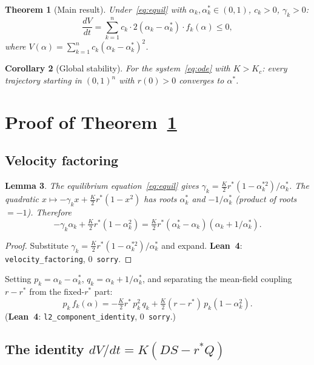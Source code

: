 \documentclass[11pt,a4paper]{article}
\newtheorem{theorem}{Theorem}[section]
\newtheorem{lemma}[theorem]{Lemma}
\newtheorem{corollary}[theorem]{Corollary}
\theoremstyle{definition}
\begin{document}
\begin{theorem}[Main result]\label{thm:main}
Under~\eqref{eq:equil} with $\alpha_k, \alpha_k^* \in (0,1)$, $c_k > 0$, $\gamma_k > 0$:
\[
\frac{dV}{dt} = \sum_{k=1}^n c_k \cdot 2(\alpha_k - \alpha_k^*) \cdot f_k(\alpha) \leq 0,
\]
where $V(\alpha) = \sum_{k=1}^n c_k (\alpha_k - \alpha_k^*)^2$.
\end{theorem}

\begin{corollary}[Global stability]\label{cor:global}
For the system~\eqref{eq:ode} with $K > K_c$: every trajectory starting in $(0,1)^n$ with $r(0) > 0$ converges to $\alpha^*$.
\end{corollary}

\section{Proof of Theorem~\ref{thm:main}}

\subsection{Velocity factoring}

\begin{lemma}\label{lem:factor}
The equilibrium equation~\eqref{eq:equil} gives $\gamma_k = \frac{K}{2}r^*(1-\alpha_k^{*2})/\alpha_k^*$. The quadratic $x \mapsto -\gamma_k x + \frac{K}{2}r^*(1-x^2)$ has roots $\alpha_k^*$ and $-1/\alpha_k^*$ (product of roots $= -1$). Therefore
\[
-\gamma_k\alpha_k + \tfrac{K}{2}r^*(1-\alpha_k^2) = \tfrac{K}{2}r^*(\alpha_k^* - \alpha_k)(\alpha_k + 1/\alpha_k^*).
\]
\end{lemma}

\begin{proof}
Substitute $\gamma_k = \frac{K}{2}r^*(1-\alpha_k^{*2})/\alpha_k^*$ and expand. \textbf{Lean~4}: \texttt{velocity\_factoring}, 0~\texttt{sorry}.
\end{proof}

Setting $p_k = \alpha_k - \alpha_k^*$, $q_k = \alpha_k + 1/\alpha_k^*$, and separating the mean-field coupling $r - r^*$ from the fixed-$r^*$ part:
\begin{equation}\label{eq:component}
p_k\,f_k(\alpha) = -\tfrac{K}{2}r^*\,p_k^2\,q_k + \tfrac{K}{2}(r-r^*)\,p_k(1-\alpha_k^2).
\end{equation}
(\textbf{Lean~4}: \texttt{l2\_component\_identity}, 0~\texttt{sorry}.)

\subsection{The identity $dV/dt = K(DS - r^*Q)$}
\end{document}
